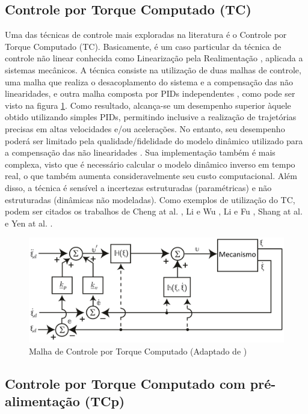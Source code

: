 \documentclass[]{politex}
\begin{document}
\subsection{Controle por Torque Computado (TC)}

Uma das técnicas de controle mais exploradas na literatura é o Controle por Torque Computado (TC). Basicamente, é um caso particular da técnica de controle não linear conhecida como Linearização pela Realimentação \cite{Slotini}, aplicada a sistemas mecânicos. A técnica consiste na utilização de duas malhas de controle, uma malha que realiza o desacoplamento do sistema e a compensação das não linearidades, e outra malha composta por PIDs independentes \cite{Craig}, como pode ser visto na figura \ref{fig:CTC}. Como resultado, alcança-se um desempenho  superior  àquele obtido utilizando simples PIDs, permitindo inclusive a realização de trajetórias precisas em altas velocidades e/ou acelerações. No entanto, seu desempenho poderá ser limitado pela qualidade/fidelidade do modelo dinâmico utilizado para a compensação das não linearidades \cite{SlotiniSMC}. Sua implementação também é mais complexa, visto que é necessário calcular o modelo dinâmico inverso em tempo real, o que também aumenta consideravelmente seu custo computacional. Além disso, a técnica é sensível a incertezas estruturadas (paramétricas) e não estruturadas (dinâmicas não modeladas). Como exemplos de utilização do TC, podem ser citados os trabalhos de Cheng at al. \cite{Cheng}, Li e Wu \cite{Li}, Li e Fu \cite{Li2}, Shang at al. \cite{Shang} e Yen at al. \cite{Yen}.

\begin{figure}[h]
	\centering
	\includegraphics[scale=0.39]{../figures/CTCnew.jpg}  
	\caption{Malha de Controle por Torque Computado (Adaptado de \cite{Craig})}
	\label{fig:CTC}
\end{figure}

\subsection{Controle por Torque Computado com pré-alimentação (TCp)}
\end{document}
